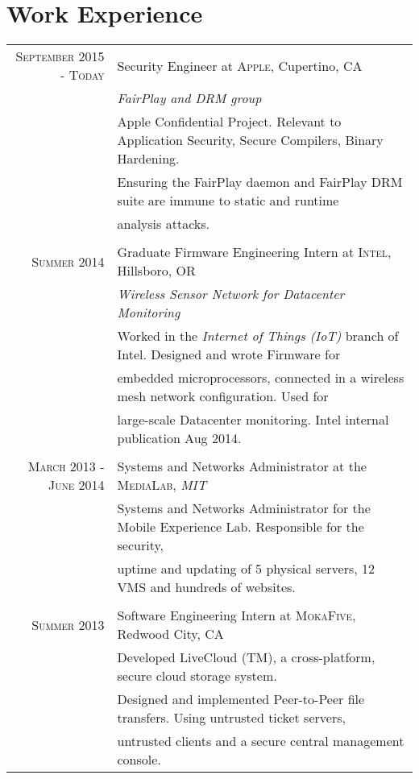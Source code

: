 \documentclass[lettersize,10pt]{article}
\begin{document}
\section{Work Experience}
\begin{tabular}{rl}

\textsc{September 2015 - Today} & Security Engineer at \textsc{Apple}, Cupertino, CA \\&\emph{FairPlay and DRM group}\\
&\footnotesize{Apple Confidential Project. Relevant to Application Security, Secure Compilers, Binary Hardening.} \\
&\footnotesize{Ensuring the FairPlay daemon and FairPlay DRM suite are immune to static and runtime }\\
&\footnotesize{analysis attacks.}\\\multicolumn{2}{c}{} \\

\textsc{Summer 2014} & Graduate Firmware Engineering Intern at \textsc{Intel}, Hillsboro, OR \\&\emph{Wireless Sensor Network for Datacenter Monitoring}\\
&\footnotesize{Worked in the \textit{Internet of Things (IoT)} branch of Intel. Designed and wrote Firmware for} \\
&\footnotesize{embedded microprocessors, connected in a wireless mesh network configuration. Used for} \\
&\footnotesize{large-scale Datacenter monitoring. Intel internal publication Aug 2014.}\\\multicolumn{2}{c}{} \\

\textsc{March 2013 - June 2014} & Systems and Networks Administrator at the \textsc{MediaLab},  \emph{MIT}\\
&\footnotesize{Systems and Networks Administrator for the Mobile Experience Lab. Responsible for the security,}\\
&\footnotesize{uptime and updating of 5 physical servers, 12 VMS  and hundreds of websites.}\\\multicolumn{2}{c}{} \\

\textsc{Summer 2013} & Software Engineering Intern at \textsc{MokaFive}, Redwood City, CA\\
&\footnotesize{Developed LiveCloud (TM), a cross-platform, secure cloud storage system. }\\
&\footnotesize{Designed and implemented Peer-to-Peer file transfers. Using untrusted ticket servers,}\\
&\footnotesize{untrusted clients and a secure central management console.}
\end{tabular}
\end{document}
